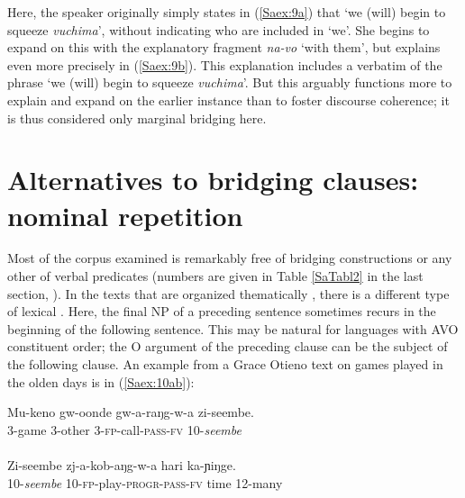 \documentclass[output=paper]{LSP/langsci}
\begin{document}
Here, the speaker originally simply states in (\ref{Saex:9a}) that `we (will) begin to squeeze \textit{vuchima}', without indicating who are included in `we'. She begins to expand on this with the explanatory fragment \textit{na-vo} `with them', but explains even more precisely in (\ref{Saex:9b}). This explanation includes a verbatim  of the phrase `we (will) begin to squeeze \textit{vuchima}'. But this  arguably functions more to explain and expand on the earlier instance than to foster discourse coherence; it is thus considered only marginal bridging here.


\section{Alternatives to bridging clauses: nominal repetition}
\label{Saalternatives}
Most of the  corpus examined is remarkably free of bridging constructions or any other  of verbal predicates (numbers are given in Table \ref{SaTabl2} in the last section, ). In the  texts that are organized thematically \citep{farr99}, there is a different type of lexical . Here, the final NP of a preceding  sentence sometimes recurs in the beginning of the following sentence. This may be natural for languages with AVO constituent order; the O argument of the preceding clause can be the subject of the following clause. An example from a Grace Otieno text on games played in the olden days is in (\ref{Saex:10ab}):


\begin{exe}
\ex \label{Saex:10ab}
\begin{xlist}
\ex \label{Saex:10a}
\gll Mu-keno  gw-oonde  gw-a-raŋg-w-a    zi-seembe. \\
\textsc{3}-game    \textsc{3}-other    \textsc{3}-\textsc{fp}-call-\textsc{pass}-\textsc{fv}  \textsc{10}-\textit{seembe}\\
\glt {}\\
\ex \label{Saex:10b}
\gll Zi-seembe  zj-a-kob-aŋg-w-a    hari  ka-ɲiŋge.\\     	       
   \textsc{10}-\textit{seembe}  \textsc{10}-\textsc{fp}-play-\textsc{progr}-\textsc{pass}-\textsc{fv}  time  \textsc{12}-many\\
\glt {} 
\end{xlist}
\end{exe}
\end{document}
